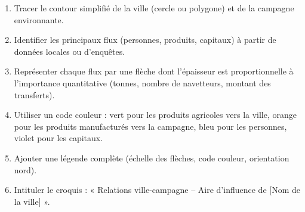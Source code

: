 \documentclass[11pt]{article}
\begin{document}
\begin{methode}
\begin{enumerate}
\item Tracer le contour simplifié de la ville (cercle ou polygone) et de la campagne environnante.
\item Identifier les principaux flux (personnes, produits, capitaux) à partir de données locales ou d'enquêtes.
\item Représenter chaque flux par une flèche dont l'épaisseur est proportionnelle à l'importance quantitative (tonnes, nombre de navetteurs, montant des transferts).
\item Utiliser un code couleur : \textcolor{popgreen}{vert} pour les produits agricoles vers la ville, \textcolor{poporange}{orange} pour les produits manufacturés vers la campagne, \textcolor{popblue}{bleu} pour les personnes, \textcolor{poppurple}{violet} pour les capitaux.
\item Ajouter une légende complète (échelle des flèches, code couleur, orientation nord).
\item Intituler le croquis : « Relations ville-campagne -- Aire d'influence de [Nom de la ville] ».
\end{enumerate}
\end{methode}
\end{document}
